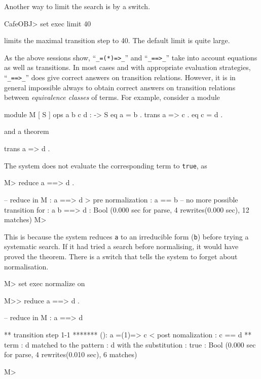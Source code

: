 \documentclass[a4paper]{memoir}
\begin{document}
Another way to limit the search is by a switch.
\begin{vvtm}
\begin{ccode}
  CafeOBJ> set exec limit 40
\end{ccode}
\end{vvtm}
limits the maximal transition step to 40. The default limit is quite
large.

As the above sessions show, ``\verb|_=(*)=>_|'' and
``\verb|_==>_|'' take into account equations as well as
transitions. In most cases and with appropriate evaluation strategies,
``\verb|_==>_|'' does give correct answers on transition relations.
However, it is in general impossible always to obtain correct answers
on transition relations between {\em equivalence classes} of terms.
For example, consider a module
\begin{vvtm}
\begin{ccode}
  module M {
    [ S ]
    ops a b c d : -> S
    eq a = b .
    trans a => c .
    eq c = d .
  }
\end{ccode}
\end{vvtm}
and a theorem
\begin{vvtm}
\begin{ccode}
  trans a => d .
\end{ccode}
\end{vvtm}
The system does not evaluate the corresponding term to \verb|true|, as
\begin{vvtm}
\begin{ccode}
  M> reduce a ==> d .

  -- reduce in M : a ==> d
  > pre normalization : a
      == b
  -- no more possible transition for : a
  b ==> d : Bool
  (0.000 sec for parse, 4 rewrites(0.000 sec), 12 matches)
  M>
\end{ccode}
\end{vvtm}
This is because the system reduces \verb|a| to an irreducible form
(\verb|b|) before trying a systematic search. If it had tried
a search before normalising, it would have proved the theorem.
There is a switch that tells the system to forget about normalisation.
\begin{vvtm}
\begin{ccode}
  M> set exec normalize on

  M>> reduce a ==> d .

  -- reduce in M : a ==> d

  ** transition step 1-1 *******
  (): a
      =(1)=> c
  < post nomalization : c
      == d
  ** term : d
   matched to the pattern : d
   with the substitution : {}
  true : Bool
  (0.000 sec for parse, 4 rewrites(0.010 sec), 6 matches)

  M>
\end{ccode}
\end{vvtm}
\end{document}
